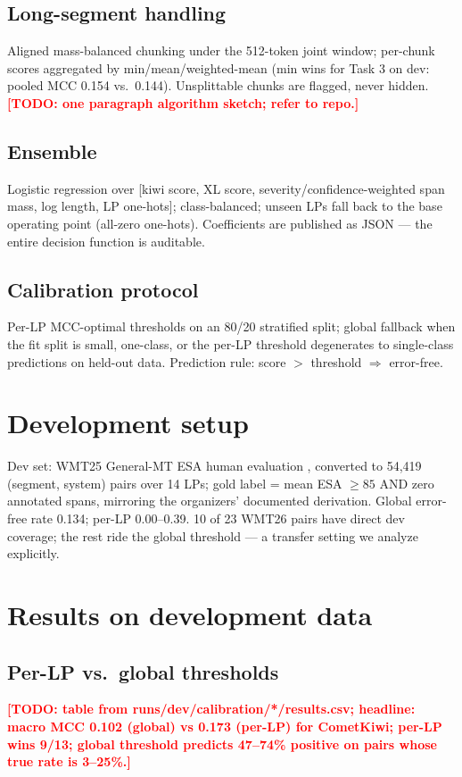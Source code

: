 \documentclass[11pt]{article}
\newcommand{\todo}[1]{\textbf{\textcolor{red}{[TODO: #1]}}}
\begin{document}
\subsection{Long-segment handling}
Aligned mass-balanced chunking under the 512-token joint window; per-chunk
scores aggregated by min/mean/weighted-mean (min wins for Task 3 on dev:
pooled MCC 0.154 vs.\ 0.144). Unsplittable chunks are flagged, never hidden.
\todo{one paragraph algorithm sketch; refer to repo.}

\subsection{Ensemble}
Logistic regression over [kiwi score, XL score, severity/confidence-weighted
span mass, log length, LP one-hots]; class-balanced; unseen LPs fall back to
the base operating point (all-zero one-hots). Coefficients are published as
JSON — the entire decision function is auditable.

\subsection{Calibration protocol}
Per-LP MCC-optimal thresholds on an 80/20 stratified split; global fallback
when the fit split is small, one-class, or the per-LP threshold degenerates
to single-class predictions on held-out data. Prediction rule: score $>$
threshold $\Rightarrow$ error-free.

\section{Development setup}
Dev set: WMT25 General-MT ESA human evaluation \cite{kocmi-etal-2025-findings},
converted to 54{,}419 (segment, system) pairs over 14 LPs; gold label =
mean ESA $\geq 85$ AND zero annotated spans, mirroring the organizers'
documented derivation. Global error-free rate 0.134; per-LP 0.00--0.39.
10 of 23 WMT26 pairs have direct dev coverage; the rest ride the global
threshold — a transfer setting we analyze explicitly.

\section{Results on development data}
\subsection{Per-LP vs.\ global thresholds}
\todo{table from runs/dev/calibration/*/results.csv; headline: macro MCC
0.102 (global) vs 0.173 (per-LP) for CometKiwi; per-LP wins 9/13; global
threshold predicts 47--74\% positive on pairs whose true rate is 3--25\%.}
\end{document}
